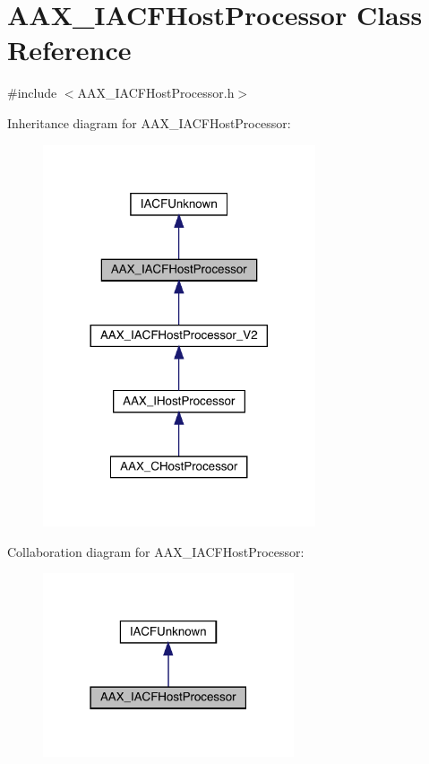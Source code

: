 \hypertarget{a01693}{}\section{A\+A\+X\+\_\+\+I\+A\+C\+F\+Host\+Processor Class Reference}
\label{a01693}


{\ttfamily \#include $<$A\+A\+X\+\_\+\+I\+A\+C\+F\+Host\+Processor.\+h$>$}



Inheritance diagram for A\+A\+X\+\_\+\+I\+A\+C\+F\+Host\+Processor\+:
\nopagebreak
\begin{figure}[H]
\begin{center}
\leavevmode
\includegraphics[width=228pt]{a01692}
\end{center}
\end{figure}


Collaboration diagram for A\+A\+X\+\_\+\+I\+A\+C\+F\+Host\+Processor\+:
\nopagebreak
\begin{figure}[H]
\begin{center}
\leavevmode
\includegraphics[width=210pt]{a01691}
\end{center}
\end{figure}


